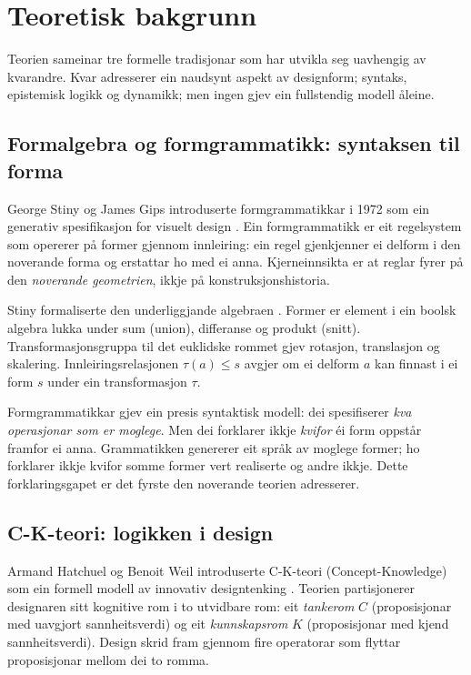 \section{Teoretisk bakgrunn}
\label{sec:background-nn}

Teorien sameinar tre formelle tradisjonar som har utvikla seg uavhengig av kvarandre. Kvar adresserer ein naudsynt aspekt av designform; syntaks, epistemisk logikk og dynamikk; men ingen gjev ein fullstendig modell åleine.

\subsection{Formalgebra og formgrammatikk: syntaksen til forma}

George Stiny og James Gips introduserte formgrammatikkar i 1972 som ein generativ spesifikasjon for visuelt design \parencite{Stiny1972}. Ein formgrammatikk er eit regelsystem som opererer på former gjennom innleiring: ein regel gjenkjenner ei delform i den noverande forma og erstattar ho med ei anna. Kjerneinnsikta er at reglar fyrer på den \textit{noverande geometrien}, ikkje på konstruksjonshistoria.

Stiny formaliserte den underliggjande algebraen \parencite{Stiny1991, Stiny2006}. Former er element i ein boolsk algebra lukka under sum (union), differanse og produkt (snitt). Transformasjonsgruppa til det euklidske rommet gjev rotasjon, translasjon og skalering. Innleiringsrelasjonen $\tau(a) \leq s$ avgjer om ei delform $a$ kan finnast i ei form $s$ under ein transformasjon $\tau$.

Formgrammatikkar gjev ein presis syntaktisk modell: dei spesifiserer \textit{kva operasjonar som er moglege}. Men dei forklarer ikkje \textit{kvifor} éi form oppstår framfor ei anna. Grammatikken genererer eit språk av moglege former; ho forklarer ikkje kvifor somme former vert realiserte og andre ikkje. Dette forklaringsgapet er det fyrste den noverande teorien adresserer.

\subsection{C-K-teori: logikken i design}

Armand Hatchuel og Benoit Weil introduserte C-K-teori (Concept-Knowledge) som ein formell modell av innovativ designtenking \parencite{Hatchuel2003, Hatchuel2009}. Teorien partisjonerer designaren sitt kognitive rom i to utvidbare rom: eit \textit{tankerom} $C$ (proposisjonar med uavgjort sannheitsverdi) og eit \textit{kunnskapsrom} $K$ (proposisjonar med kjend sannheitsverdi). Design skrid fram gjennom fire operatorar som flyttar proposisjonar mellom dei to romma.

